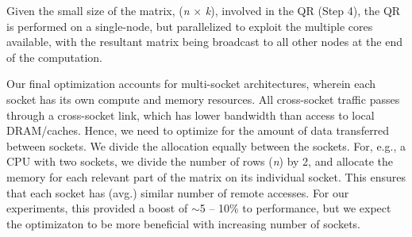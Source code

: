 Given the small size of the matrix, ({\it{n}} $\times$ {\it{k}}), involved in the QR (Step 4),
the QR is performed on a single-node, but
parallelized to exploit the multiple cores available, with the resultant matrix
being broadcast to all other nodes at the end of the computation.

Our final optimization accounts for multi-socket architectures, wherein
each socket has its own compute and memory resources. All cross-socket traffic
passes through a cross-socket link, which has lower bandwidth than access to
local DRAM/caches. Hence, we need to optimize for the amount of data
transferred between sockets. We divide the allocation equally between the
sockets. For, e.g., a CPU with two sockets, we divide the number of rows ({\it{n}}) by 2, and
allocate the memory for each relevant part of the matrix on its individual
socket. This ensures that each socket has (avg.) similar number of remote
accesses. For our experiments, this provided a boost of $\sim$5 -- 10\% to
performance, but we expect the optimizaton to be more beneficial with
increasing number of sockets.



